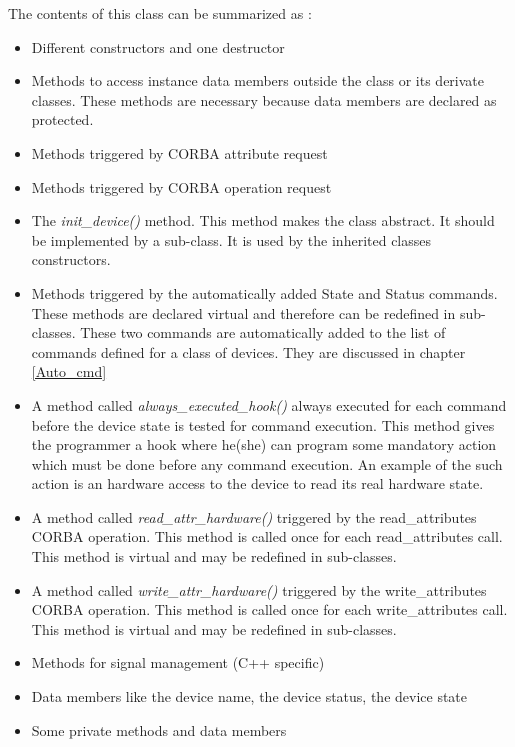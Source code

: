 The contents of this class can be summarized as :
\begin{itemize}
\item Different constructors and one destructor
\item Methods to access instance data members outside the class or its derivate
classes. These methods are necessary because data members are declared
as protected.
\item Methods triggered by CORBA attribute request
\item Methods triggered by CORBA operation request
\item The \emph{init\_device()} method. This method
makes the class abstract. It should be implemented by a sub-class.
It is used by the inherited classes constructors.
\item Methods triggered by the automatically added State and
Status commands. These methods are declared virtual
and therefore can be redefined in sub-classes. These two commands
are automatically added to the list of commands defined for a class
of devices. They are discussed in chapter \ref{Auto_cmd}
\item A method called \emph{always\_executed\_hook()}
always executed for each command before the device state is tested
for command execution. This method gives the programmer a hook where
he(she) can program some mandatory action which must be done before
any command execution. An example of the such action is an hardware
access to the device to read its real hardware state.
\item A method called \emph{read\_attr\_hardware()}
triggered by the read\_attributes CORBA operation.
This method is called once for each read\_attributes
call. This method is virtual and may be redefined in sub-classes. 
\item A method called \emph{write\_attr\_hardware()}
triggered by the write\_attributes CORBA
operation. This method is called once for each write\_attributes
call. This method is virtual and may be redefined in sub-classes. 
\item Methods for signal management (C++ specific) 
\item Data members like the device name, the device status,
the device state
\item Some private methods and data members
\end{itemize}

